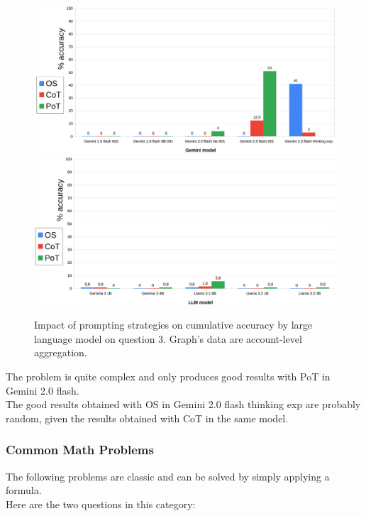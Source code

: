 \documentclass[12pt]{article}
\begin{document}
\begin{figure}[H]
    \centering
            \includegraphics[width=1\textwidth]{q105Gemini.png}
            \includegraphics[width=1\textwidth]{q105Other.png}
    \caption[Accuracy on Question 3 by LLM]{Impact of prompting strategies on cumulative accuracy by large language model on question 3. Graph's data are account-level aggregation.}
    \end{figure} 
The problem is quite complex and only produces good results with PoT in Gemini 2.0 flash.\\ 
The good results obtained with OS in Gemini 2.0 flash thinking exp are probably random, given the results obtained with CoT in the same model.\\

\vspace{2cm}

\subsubsection{Common Math Problems} %
The following problems are classic and can be solved by simply applying a formula.\\
Here are the two questions in this category:\\
\end{document}
